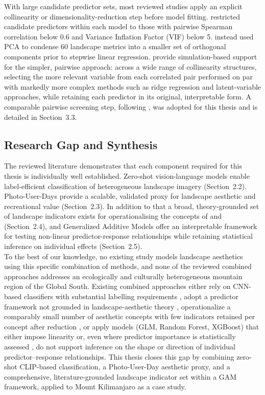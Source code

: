 \documentclass[hidelinks, 11pt]{article}
\begin{document}
With large candidate predictor sets, most reviewed studies apply an explicit collinearity or dimensionality-reduction step before model fitting. \citet{vaz_digital_2020} restricted candidate predictors within each model to those with pairwise Spearman correlation below 0.6 and Variance Inflation 
Factor (VIF) below 5. \citet{schirpke_predicting_2013} instead used PCA to condense 60 landscape metrics into a smaller set of orthogonal components prior to stepwise linear regression. \citet{dormann_collinearity_2013} provide simulation-based support for the simpler, pairwise approach: across a wide range of collinearity structures, selecting the more relevant variable from each correlated pair performed on par with markedly more complex methods such as ridge regression and latent-variable approaches, while retaining each predictor in its original, interpretable form. A comparable pairwise 
screening step, following \citet{vaz_digital_2020}, was adopted for this thesis and is detailed in Section~3.3.

\subsection{Research Gap and Synthesis}
The reviewed literature demonstrates that each component required for this thesis is individually well established. Zero-shot vision-language models 
enable label-efficient classification of heterogeneous landscape imagery (Section~2.2). Photo-User-Days provide a scalable, validated proxy for landscape aesthetic and recreational value (Section~2.3). In addition to that a broad, theory-grounded set of landscape indicators exists for operationalising the concepts of \citet{ode_capturing_2008} and 
\citet{tveit_key_2006} (Section~2.4), and Generalized Additive Models offer an interpretable framework for testing non-linear predictor-response relationships while retaining statistical inference on individual effects (Section~2.5).
\\
To the best of our knowledge, no existing study models landscape aesthetics using this specific combination of methods, and none of the reviewed combined approaches addresses an ecologically and culturally heterogeneous mountain region of the Global South. Existing combined approaches either rely on CNN-based classifiers with substantial labelling requirements \citep{havinga_social_2021, comalada_modelling_2025}, adopt a predictor framework not grounded in landscape-aesthetic theory \citep{vaz_digital_2020}, operationalize a comparably small number of aesthetic concepts with few indicators retained per concept after reduction \citep{tenerelli_spatial_2017}, or apply models (GLM, Random Forest, XGBoost) that either impose linearity or, even where predictor importance is statistically assessed \citep{comalada_modelling_2025}, do not support inference on the shape or direction of individual predictor–response relationships. This thesis closes this gap by combining zero-shot CLIP-based classification, a Photo-User-Day aesthetic proxy, and a comprehensive, literature-grounded landscape indicator set within a GAM framework, applied to Mount Kilimanjaro as a case study.
\end{document}
